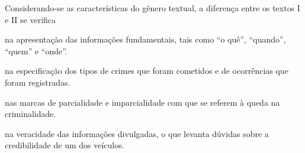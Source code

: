 Considerando-se as características do gênero textual, a diferença entre
os textos I e II se verifica

\begin{escolha}
\item na apresentação das informações fundamentais, tais como ``o quê'',
``quando'', ``quem'' e ``onde''.

\item na especificação dos tipos de crimes que foram cometidos e de ocorrências que foram registradas.

\item nas marcas de parcialidade e imparcialidade com que se referem à
queda na criminalidade.

\item na veracidade das informações divulgadas, o que levanta dúvidas sobre
a credibilidade de um dos veículos.
\end{escolha}